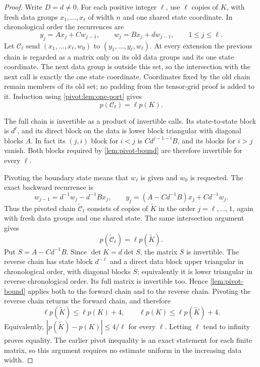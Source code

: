 \begin{proof}
Write $D=d\ne0$. For each positive integer $\ell$, use $\ell$
copies of $K$, with fresh data groups $x_1,\ldots,x_\ell$ of width
$n$ and one shared state coordinate. In chronological order the
recurrences are
\begin{equation}\label{pivot:eq:chain-forward}
 y_j=Ax_j+Cw_{j-1},\qquad
 w_j=Bx_j+dw_{j-1},\qquad 1\le j\le\ell.
\end{equation}
Let $\mathcal C_\ell$ send
$(x_1,\ldots,x_\ell,w_0)$ to
$(y_1,\ldots,y_\ell,w_\ell)$. At every extension the previous
chain is regarded as a matrix only on its old data groups and its
one state coordinate. The next data group is outside this set, so
the intersection with the next call is exactly the one state
coordinate. Coordinates fixed by the old chain remain members of
its old set; no padding from the tensor-grid proof is added to it.
Induction using \cref{pivot:lem:one-port} gives
\begin{equation}\label{pivot:eq:forward-chain-price}
 p(\mathcal C_\ell)=\ell p(K).
\end{equation}

The full chain is invertible as a product of invertible calls. Its
state-to-state block is $d^\ell$, and its direct block on the data is
lower block triangular with diagonal blocks $A$. In fact its
$(j,i)$ block for $i<j$ is $Cd^{j-1-i}B$, and its blocks for $i>j$
vanish. Both blocks required by \cref{lem:pivot-bound} are therefore
invertible for every $\ell$.

Pivoting the boundary state means that $w_\ell$ is given and $w_0$
is requested. The exact backward recurrence is
\begin{equation}\label{pivot:eq:chain-backward}
 w_{j-1}=d^{-1}w_j-d^{-1}Bx_j,\qquad
 y_j=(A-Cd^{-1}B)x_j+Cd^{-1}w_j.
\end{equation}
Thus the pivoted chain $\widetilde{\mathcal C}_\ell$ consists of
copies of $\widetilde K$ in the order $j=\ell,\ldots,1$, again
with fresh data groups and one shared state. The same intersection
argument gives
\begin{equation}\label{pivot:eq:reverse-chain-price}
 p(\widetilde{\mathcal C}_\ell)=\ell p(\widetilde K).
\end{equation}
Put $S=A-Cd^{-1}B$. Since $\det K=d\det S$, the matrix $S$ is
invertible. The reverse chain has state block $d^{-\ell}$ and a
direct data block upper triangular in chronological order, with
diagonal blocks $S$; equivalently it is lower triangular in reverse
chronological order. Its full matrix is invertible too. Hence
\cref{lem:pivot-bound} applies both to the forward chain and to
the reverse chain. Pivoting the reverse chain returns the forward
chain, and therefore
\[
 \ell p(\widetilde K)\le\ell p(K)+4,
 \qquad
 \ell p(K)\le\ell p(\widetilde K)+4.
\]
Equivalently, $|p(\widetilde K)-p(K)|\le4/\ell$ for every $\ell$.
Letting $\ell$ tend to infinity proves equality. The earlier pivot
inequality is an exact statement for each finite matrix, so this
argument requires no estimate uniform in the increasing data width.
\end{proof}


